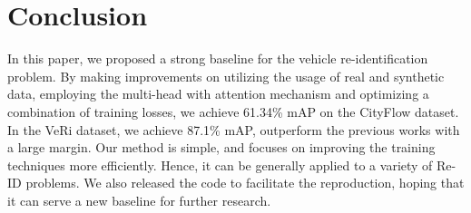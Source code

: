 \documentclass[10pt,twocolumn,letterpaper]{article}
\begin{document}
\section{Conclusion}
In this paper, we proposed a strong baseline for the vehicle re-identification problem. By making improvements on utilizing the usage of real and synthetic data, employing the multi-head with attention mechanism and optimizing a combination of training losses, we achieve 61.34\% mAP on the CityFlow dataset. In the VeRi dataset, we achieve 87.1\% mAP, outperform the previous works with a large margin. Our method is simple, and focuses on improving the training techniques more efficiently.
Hence, it can be generally applied to a variety of Re-ID problems. We also released the code to facilitate the reproduction, hoping that it can serve a new baseline for further research. 
{\small
	
	
}
\end{document}
